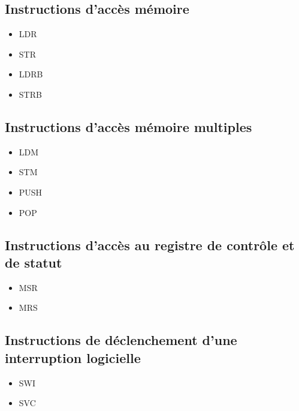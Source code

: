 \documentclass{tufte-handout}
\begin{document}
\subsection{Instructions d'accès mémoire}
\begin{itemize}
	\item LDR
	\item STR
	\item LDRB
	\item STRB
\end{itemize}

\subsection{Instructions d'accès mémoire multiples}
\begin{itemize}
	\item LDM
	\item STM
	\item PUSH
	\item POP
\end{itemize}

\subsection{Instructions d'accès au registre de contrôle et de statut}
\begin{itemize}
	\item MSR
	\item MRS
\end{itemize}

\subsection{Instructions de déclenchement d'une interruption logicielle}
\begin{itemize}
	\item SWI
	\item SVC
\end{itemize}
\end{document}
